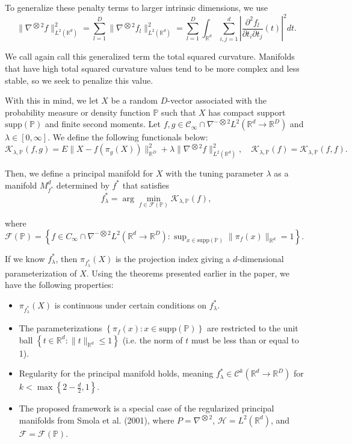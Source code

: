 To generalize these penalty terms to larger intrinsic dimensions, we use
\[%
  \|\nabla^{\bigotimes 2}f\|_{L^2(\mathbb{R}^{d})}^2 = \sum_{l=1}^{D}\|\nabla^{\bigotimes 2}f_l\|_{L^2(\mathbb{R}^{d})}^2 = \sum_{l = 1}^{D}\int_{\mathbb{R}^{d}}\sum_{i, j=1}^{d} \left|\frac{\partial^2f_l}{\partial t_i \partial t_j}(t)\right|^2dt
.\]%

We call again call this generalized term the total squared curvature. Manifolds that have high total squared curvature values tend to be more complex and less stable, so we seek to penalize this value. 

With this in mind, we let $X$ be a random $D$-vector associated with the probability measure or density function $\mathbb{P}$ such that $X$ has compact support $\text{supp}(\mathbb{P})$ and finite second moments. Let $f, g \in \mathcal{C}_{\infty} \cap \nabla^{-\bigotimes 2}L^2(\mathbb{R}^{d} \to \mathbb{R}^{D})$ and $\lambda \in [0, \infty]$. We define the following functionals below:
\[%
  \mathcal{K}_{\lambda, \mathbb{P}}(f, g) = E \|X - f(\pi_g(X))\|_{\mathbb{R}^{D}}^2 + \lambda\|\nabla^{\bigotimes 2}f\|_{L^2(\mathbb{R}^{d})}^2, \quad \mathcal{K}_{\lambda, \mathbb{P}}(f) = \mathcal{K}_{\lambda, \mathbb{P}}(f, f)
.\]%

Then, we define a principal manifold for $X$ with the tuning parameter $\lambda$ as a manifold $M_{f^{*}}^{d}$ determined by $f^{*}$ that satisfies
\[%
  f_{\lambda}^{*} = \arg \min_{f \in \mathcal{F}(\mathbb{P})}\mathcal{K}_{\lambda, \mathbb{P}}(f)
,\]%

where $\mathcal{F}(\mathbb{P}) = \left\{f \in C_{\infty} \cap \nabla^{-\bigotimes 2}L^2(\mathbb{R}^{d} \to \mathbb{R}^{D}): \sup_{x \in \text{supp}(\mathbb{P})}\|\pi_f(x)\|_{\mathbb{R}^{d}} = 1\right\}$.

If we know $f_{\lambda}^{*}$, then $\pi_{f_{\lambda}^{*}}(X)$ is the projection index giving a $d$-dimensional parameterization of $X$. Using the theorems presented earlier in the paper, we have the following properties:
\begin{itemize}
  \label{item:principal_manifold_properties}

  \item $\pi_{f_{\lambda}^{*}}(X)$ is continuous under certain conditions on $f_{\lambda}^{*}$.
  \item The parameterizations $\left\{\pi_f(x): x \in \text{supp}(\mathbb{P})\right\}$ are restricted to the unit ball $\left\{t \in \mathbb{R}^{d}: \|t\|_{\mathbb{R}^{d}} \leq 1\right\}$ (i.e. the norm of $t$ must be less than or equal to 1).
  \item Regularity for the principal manifold holds, meaning $f_{\lambda}^{*} \in \mathcal{C}^{k}(\mathbb{R}^{d} \to \mathbb{R}^{D})$ for $k < \max\left\{2 - \frac{d}{2}, 1\right\}$.
  \item The proposed framework is a special case of the regularized principal manifolds from Smola et al. (2001), where $P = \nabla^{\bigotimes 2}$, $\mathcal{H} = L^2(\mathbb{R}^{d})$, and $\mathcal{F} = \mathcal{F}(\mathbb{P})$.
\end{itemize}

